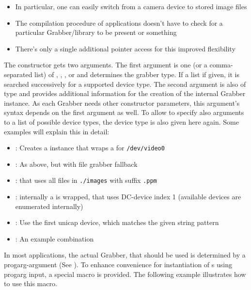\begin{enumerate}
\begin{itemize}
\item In particular, one can easily switch from a camera device to stored image files
\item The compilation procedure of applications doesn't have to check for a particular Grabber/library to be present or something
\item There's only a single additional pointer access for this improved flexibility
\end{itemize}
The  constructor gets two arguments. The first argument is one (or a comma-separated list) of , , ,  or   and determines the grabber type. If a list if given, it is searched successively for a supported device type. The second argument is also of type  and provides additional information for the creation of the internal Grabber instance. As each Grabber needs other constructor parameters, this argument's syntax depends on the first argument as well. To allow to specify also arguments to a list of possible device types, the device type is also given here again. Some examples will explain this in detail:
\begin{itemize}
\item {}: Creates a  instance that wraps a  for \texttt{/dev/video0}
\item {}: As above, but with file grabber fallback
\item {}:  that uses all files in \texttt{./images} with suffix \texttt{.ppm}
\item {}: internally a  is wrapped, that uses DC-device index 1 (available devices are enumerated internally)
\item {}: Use the first unicap device, which matches the given string pattern
\item {}: An example combination
\end{itemize}
In most applications, the actual Grabber, that should be used is determined by a progarg-argument (See ). To enhance convenience for instantiation of  s using progarg input, a special macro  is provided. The following example illustrates how to use this macro. 


\end{enumerate}
